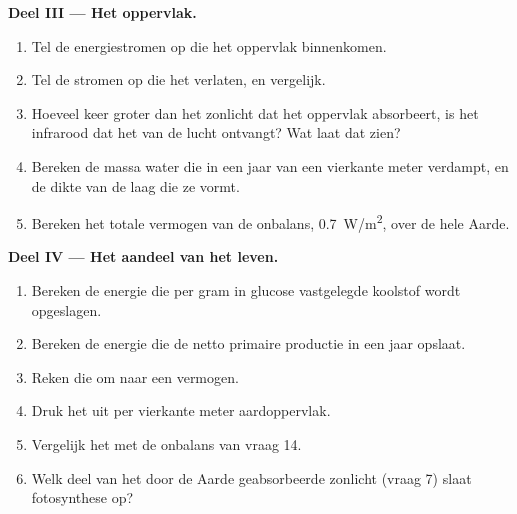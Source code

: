 \begin{problem}
\medskip
\noindent\textbf{Deel III --- Het oppervlak.}
\begin{enumerate}[resume]
  \item Tel de energiestromen op die het oppervlak binnenkomen.
  \item Tel de stromen op die het verlaten, en vergelijk.
  \item Hoeveel keer groter dan het zonlicht dat het oppervlak absorbeert, is het
        infrarood dat het van de lucht ontvangt? Wat laat dat zien?
  \item Bereken de massa water die in een jaar van een vierkante meter verdampt,
        en de dikte van de laag die ze vormt.
  \item Bereken het totale vermogen van de onbalans, \qty{0.7}{W/m^2}, over de
        hele Aarde.
\end{enumerate}

\medskip
\noindent\textbf{Deel IV --- Het aandeel van het leven.}
\begin{enumerate}[resume]
  \item Bereken de energie die per gram in glucose vastgelegde koolstof wordt opgeslagen.
  \item Bereken de energie die de netto primaire productie in een jaar opslaat.
  \item Reken die om naar een vermogen.
  \item Druk het uit per vierkante meter aardoppervlak.
  \item Vergelijk het met de onbalans van vraag 14.
  \item Welk deel van het door de Aarde geabsorbeerde zonlicht (vraag 7) slaat
        fotosynthese op?
\end{enumerate}
\end{problem}
